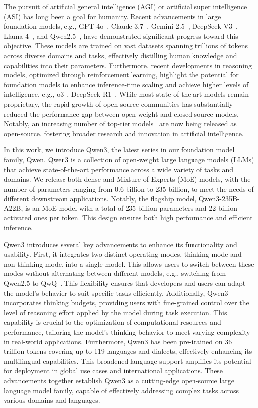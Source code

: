 \documentclass[dvipsnames]{article}
\begin{document}
The pursuit of artificial general intelligence (AGI) or artificial super intelligence (ASI) has long been a goal for humanity. Recent advancements in large foundation models, e.g., GPT-4o~\citep{gpt4o}, Claude 3.7~\citep{claude3.7}, Gemini 2.5~\citep{gemini2.5}, DeepSeek-V3~\citep{deepseekv3}, Llama-4~\citep{llama4}, and Qwen2.5~\citep{qwen2.5}, have demonstrated significant progress toward this objective. These models are trained on vast datasets spanning trillions of tokens across diverse domains and tasks, effectively distilling human knowledge and capabilities into their parameters. Furthermore, recent developments in reasoning models, optimized through reinforcement learning, highlight the potential for foundation models to enhance inference-time scaling and achieve higher levels of intelligence, e.g., o3~\citep{o3}, DeepSeek-R1~\citep{r1}. While most state-of-the-art models remain proprietary, the rapid growth of open-source communities has substantially reduced the performance gap between open-weight and closed-source models. Notably, an increasing number of top-tier models~\citep{llama4, deepseekv3, r1, qwen2.5} are now being released as open-source, fostering broader research and innovation in artificial intelligence.

In this work, we introduce Qwen3, the latest series in our foundation model family, Qwen. Qwen3 is a collection of open-weight large language models (LLMs) that achieve state-of-the-art performance across a wide variety of tasks and domains. We release both dense and Mixture-of-Experts (MoE) models, with the number of parameters ranging from 0.6 billion to 235 billion, to meet the needs of different downstream applications. Notably, the flagship model, Qwen3-235B-A22B, is an MoE model with a total of 235 billion parameters and 22 billion activated ones per token. This design ensures both high performance and efficient inference.

Qwen3 introduces several key advancements to enhance its functionality and usability. First, it integrates two distinct operating modes, thinking mode and non-thinking mode, into a single model. This allows users to switch between these modes without alternating between different models, e.g., switching from Qwen2.5 to QwQ~\citep{qwq}. This flexibility ensures that developers and users can adapt the model's behavior to suit specific tasks efficiently. Additionally, Qwen3 incorporates thinking budgets, providing users with fine-grained control over the level of reasoning effort applied by the model during task execution. This capability is crucial to the optimization of computational resources and performance, tailoring the model's thinking behavior to meet varying complexity in real-world applications. Furthermore, Qwen3 has been pre-trained on 36 trillion tokens covering up to 119 languages and dialects, effectively enhancing its multilingual capabilities. This broadened language support amplifies its potential for deployment in global use cases and international applications. 
These advancements together establish Qwen3 as a cutting-edge open-source large language model family, capable of effectively addressing complex tasks across various domains and languages.
\end{document}
